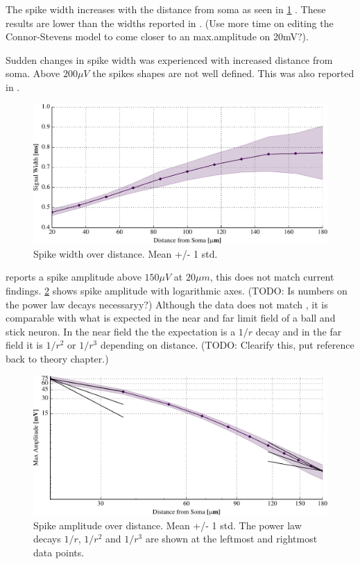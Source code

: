 \documentclass[altfont, fleqn]{uiophd}
\let\mycref\cref
\renewcommand{\cref}[1]{{\color{viridis_03}\mycref{#1}} }
\begin{document}
The spike width increases with the distance from soma as seen in 
\cref{fig:3_1_spike_width}. These results are 
lower than the widths reported in \textcite{pettersen_amplitude_2008}.
(Use more time on editing the Connor-Stevens model to come closer to 
an max.amplitude on 20mV?).   

Sudden changes in spike width was experienced with increased distance from
soma. Above $200\mu V$ the
spikes shapes are not well defined. 
This was also reported in \textcite{pettersen_amplitude_2008}.\\

\begin{figure}[thp]
\centering
\includegraphics[width=\textwidth]{images/3_methods/3_1_reproduction/circular_spike_width_std.pdf}
\caption{Spike width over distance. Mean +/- 1 std.}
\label{fig:3_1_spike_width}
\end{figure}

\textcite{pettersen_amplitude_2008} reports a spike amplitude above $150\mu V$ at 
$20\mu m$, this does not match current findings.  
\cref{fig:3_1_spike_amp} shows spike amplitude with logarithmic axes.  
(TODO: Is numbers on the power law decays necessaryy?) Although 
the data does not match \textcite{pettersen_amplitude_2008}, 
it is comparable with what is
expected in the near and far limit field of a ball and stick neuron.
In the near field the the expectation is a $1/r$ decay and in the far field
it is  $1/r^2$ or $1/r^3$ depending on distance. (TODO: Clearify this, put reference
back to theory chapter.)

\begin{figure}[thp]
\centering
\includegraphics[width=\textwidth]{images/3_methods/3_1_reproduction/circular_spike_amp_std_log.pdf}
\caption{Spike amplitude over distance. Mean +/- 1 std. The power law
decays $1/r$, $1/r^2$ and $1/r^3$ are shown at the leftmost and rightmost
data points.}
\label{fig:3_1_spike_amp}
\end{figure}
\end{document}

